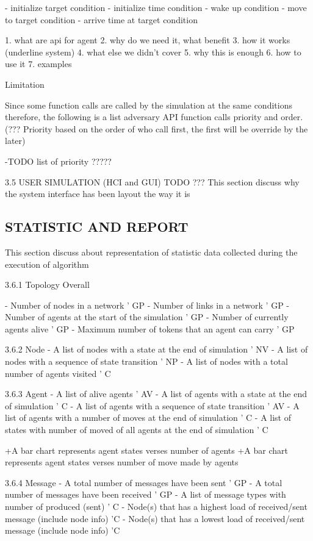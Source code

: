 \begin{description}
\begin{description}
\begin{description}
\begin{description}
- initialize target condition
- initialize time condition
- wake up condition
- move to target condition
- arrive time at target condition

1. what are api for agent
2. why do we need it, what benefit
3. how it works (underline system)
4. what else we didn't cover
5. why this is enough
6. how to use it
7. examples


Limitation

Since some function calls are called by the simulation at the same conditions therefore, the following is a list adversary API function calls priority and order. (??? Priority based on the order of who call first, the first will be override by the later)

-TODO list of priority ?????

3.5 USER SIMULATION (HCI and GUI) TODO ???
This section discuss why the system interface has been layout the way it is

\subsection{STATISTIC AND REPORT}
This section discuss about representation of statistic data collected during the execution of algorithm

3.6.1 Topology Overall

- Number of nodes in a network ' GP
- Number of links in a network ' GP
- Number of agents at the start of the simulation ' GP
- Number of currently agents alive ' GP
- Maximum number of tokens that an agent can carry ' GP

3.6.2 Node
- A list of nodes with a state at the end of simulation ' NV
- A list of nodes with a sequence of state transition ' NP
- A list of nodes with a total number of agents visited ' C

3.6.3 Agent
- A list of alive agents ' AV
- A list of agents with a state at the end of simulation ' C
- A list of agents with a sequence of state transition ' AV
- A list of agents with a number of moves at the end of simulation ' C
- A list of states with number of moved of all agents at the end of simulation  ' C

+A bar chart represents agent states verses number of agents
+A bar chart represents agent states verses number of move made by agents


3.6.4 Message
- A total number of messages have been sent ' GP
- A total number of messages have been received ' GP
- A list of message types with number of produced (sent) ' C
- Node(s) that has a highest load of received/sent message (include node info) 'C
- Node(s) that has a lowest load of received/sent message (include node info) 'C


\end{description}
\end{description}
\end{description}
\end{description}
